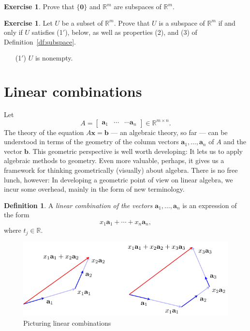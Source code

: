 \documentclass[12pt]{amsart}
\newcommand{\RR}{\mathbb{R}}
\theoremstyle{definition} \newtheorem{definition}[theorem]{Definition}
\newtheorem{exercise}[theorem]{Exercise}
\newcommand{\ba}{\mathbf{a}}
\newcommand{\bb}{\mathbf{b}}
\newcommand{\bx}{\mathbf{x}}
\newcommand{\bzero}{\mathbf{0}}
\newcommand{\bas}{\ba_1,\ldots,\ba_n}
\newcommand{\mat}[1]{\begin{bmatrix}#1\end{bmatrix}}
\begin{document}
\begin{exercise}
  Prove that $\{\bzero\}$ and $\RR^m$ are subspaces of $\RR^m$.
\end{exercise}

\begin{exercise}
  Let $U$ be a subset of $\RR^m$.
  Prove that $U$ is a subspace of $\RR^m$ if and only if $U$ satisfies
  (1$'$), below, as well as properties (2), and (3) of Definition~\ref{df:subspace}.
  \begin{enumerate}
    \item[(1$'$)] $U$ is nonempty.
  \end{enumerate}
\end{exercise}

\section{Linear combinations}
Let
\[
  A = \mat{\ba_1&\cdots&\cdots \ba_n}\in\RR^{m\times n}.
\]
The theory of the equation $A\bx=\bb$ --- an algebraic theory, so far --- can be understood in terms of the geometry of the column vectors $\bas$ of $A$ and the vector $\bb$.
This geometric perspective is well worth developing:
It lets us to apply algebraic methods to geometry.
Even more valuable, perhaps, it gives us a framework for thinking geometrically (visually) about algebra. 
There is no free lunch, however:
In developing a geometric point of view on linear algebra, we incur some overhead, mainly in the form of new terminology.

\begin{definition}\label{df:lc}
  A \emph{linear combination of the vectors $\bas$} is an expression of the form
  \[ x_1\ba_1+\cdots +x_n\ba_n, \]
  where $t_j\in \RR$.
\end{definition}

\begin{figure}
\includegraphics[scale=1.5]{lincombs.pdf}
\caption{Picturing linear combinations}
\end{figure}
\end{document}
